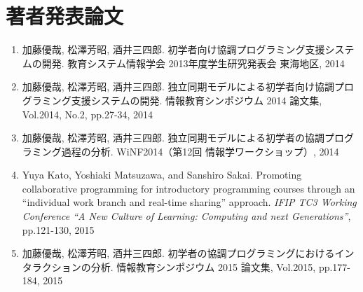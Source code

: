 \chapter*{著者発表論文}
\begin{enumerate}
\renewcommand{\labelenumi}{[\arabic{enumi}]}

\item 加藤優哉, 松澤芳昭, 酒井三四郎. 
初学者向け協調プログラミング支援システムの開発.  
教育システム情報学会 2013年度学生研究発表会 東海地区, 2014

\item 加藤優哉, 松澤芳昭, 酒井三四郎. 
独立同期モデルによる初学者向け協調プログラミング支援システムの開発.  
情報教育シンポジウム 2014 論文集, Vol.2014, No.2, pp.27-34, 2014

\item 加藤優哉, 松澤芳昭, 酒井三四郎. 
独立同期モデルによる初学者の協調プログラミング過程の分析.  
WiNF2014（第12回 情報学ワークショップ）, 2014

\item Yuya Kato, Yoshiaki Matsuzawa, and Sanshiro Sakai. 
Promoting collaborative programming for introductory programming courses through an “individual work branch and real-time sharing” approach.  
{\it IFIP TC3 Working Conference “A New Culture of Learning: Computing and next Generations”}, pp.121-130, 2015

\item 加藤優哉, 松澤芳昭, 酒井三四郎. 
初学者の協調プログラミングにおけるインタラクションの分析.  
情報教育シンポジウム 2015 論文集, Vol.2015, pp.177-184, 2015

\end{enumerate}